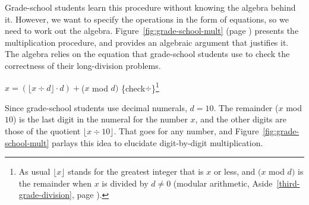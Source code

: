 Grade-school students learn this procedure without knowing
the algebra behind it. However, we want to specify the operations in
the form of equations, so we need to work out the algebra.
Figure~\ref{fig:grade-school-mult} (page \pageref{fig:grade-school-mult})
presents the multiplication procedure,
and provides an algebraic argument that justifies it.
The algebra relies on the equation
that grade-school students use to check the correctness of their long-division problems.

\hspace{2mm} $x = (\lfloor x \div d \rfloor \cdot d) + $($x$ mod $d)$ \hfill \{check$\div$\}\footnote{As
usual $\lfloor x\rfloor$ stands for the greatest integer that is $x$ or less,
and $(x$ mod $d)$ is the remainder when $x$ is divided by $d \neq 0$ (modular arithmetic,
Aside~\ref{third-grade-division}, page \pageref{third-grade-division}).}
\vspace{2mm}

Since grade-school students use decimal numerals,  $d = 10$.
The remainder ($x$ mod $10$) is the last digit in the numeral for the number $x$,
and the other digits are those of the quotient $\lfloor x \div 10 \rfloor$.
That goes for any number, and
Figure~\ref{fig:grade-school-mult}
parlays this idea to elucidate digit-by-digit multiplication.

